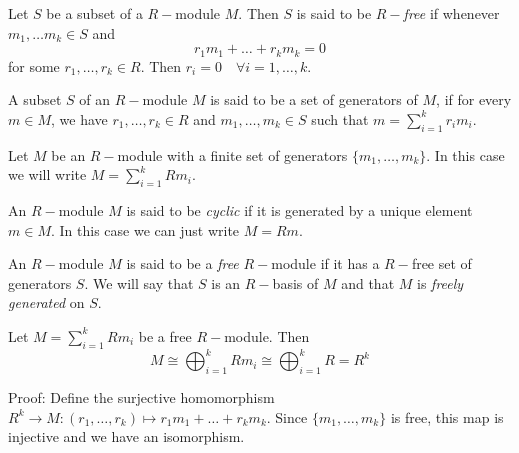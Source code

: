 \begin{dang}
    \begin{definition}\cite{curtis1966representation}
        Let $S$ be a subset of a $R-$module $M$. Then $S$ is said to be $R-$\textit{free} if whenever $m_1,\dots m_k\in S$ and
        \[
        r_1m_1+\dots+r_km_k=0 
        \]
        for some $r_1,\dots,r_k\in R$. Then $r_i=0\quad\forall i=1,\dots,k$. 
    \end{definition}
\end{dang}
\begin{dang}
    \begin{definition}\cite{curtis1966representation}
        A subset $S$ of an $R-$module $M$ is said to be a set of generators of $M$, if for every $m\in M$, we have $r_1,\dots,r_k\in R$ and $m_1,\dots,m_k\in S$ such that $m=\sum_{i=1}^kr_im_i$. 
    \end{definition}
\end{dang}
\begin{dang}
    \begin{notation}
        Let $M$ be an $R-$module with a finite set of generators $\{m_1,\dots,m_k\}$. In this case we will write $M = \sum_{i=1}^kRm_i$.
    \end{notation}
\end{dang}
\begin{dang}
    \begin{definition}\cite{curtis1966representation}
        An $R-$module $M$ is said to be \textit{cyclic} if it is generated by a unique element $m\in M$. In this case we can just write $M=Rm$.
    \end{definition}
\end{dang}
\begin{dang}
    \begin{definition}\cite{curtis1966representation}
        An $R-$module $M$ is said to be a \textit{free} $R-$module if it has a $R-$free set of generators $S$. We will say that $S$ is an $R-$basis of $M$ and that $M$ is \textit{freely generated} on $S$.
    \end{definition}
\end{dang}
\begin{dang}
    \begin{corollary}\cite{curtis1966representation}
       Let $M=\sum_{i=1}^kRm_i$ be a free $R-$module. Then 
       \[
       M\cong \bigoplus_{i=1}^{k}Rm_i\cong\bigoplus_{i=1}^{k}R=R^k
       \]
    \end{corollary}
\end{dang}
Proof: Define the surjective homomorphism $R^k\rightarrow M:(r_1,\dots,r_k)\mapsto r_1m_1+\dots+r_km_k$. Since $\{m_1,\dots,m_k\}$ is free, this map is injective and we have an isomorphism.


